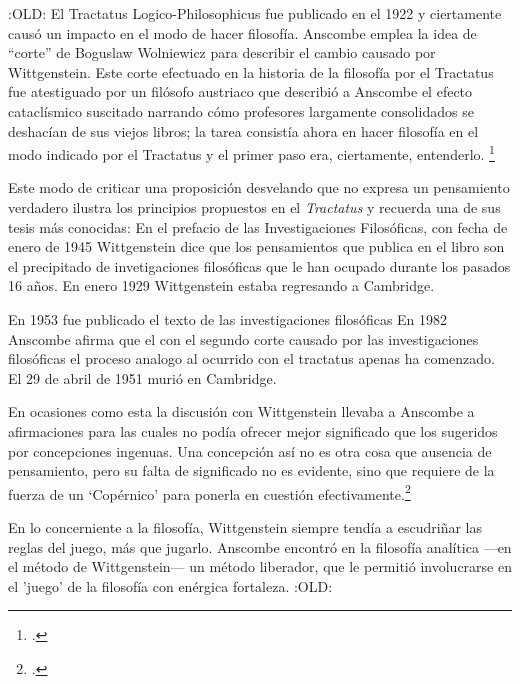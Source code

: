 \begin{revision}
:OLD:
El Tractatus Logico-Philosophicus fue publicado en el 1922 y ciertamente causó
un impacto en el modo de hacer filosofía. Anscombe emplea la idea de ``corte''
de Boguslaw Wolniewicz para describir el cambio causado por Wittgenstein. Este
corte efectuado en la historia de la filosofía por el Tractatus fue atestiguado
por un filósofo austriaco que describió a Anscombe el efecto cataclísmico
suscitado narrando cómo profesores largamente consolidados se deshacían de sus
viejos libros; la tarea consistía ahora en hacer filosofía en el modo indicado
por el Tractatus y el primer paso era, ciertamente, entenderlo.
\footcite[p.181]{twocuts} 
\end{revision}

\begin{revision}
Este modo de criticar una proposición desvelando que no expresa un pensamiento
verdadero ilustra los principios propuestos en el \emph{Tractatus} y recuerda
una de sus tesis más conocidas: 
En el prefacio de las Investigaciones Filosóficas, con fecha de enero de 1945
Wittgenstein dice que los pensamientos que publica en el libro son el
precipitado de invetigaciones filosóficas que le han ocupado durante los pasados
16 años. En enero 1929 Wittgenstein estaba regresando a Cambridge.
\end{revision}

\begin{revision}
En 1953 fue publicado el texto de las investigaciones filosóficas
En 1982 Anscombe afirma que el con el segundo corte causado por las
investigaciones filosóficas el proceso analogo al ocurrido con el tractatus
apenas ha comenzado.
El 29 de abril de 1951 murió en Cambridge. 
\end{revision}

\begin{revision}
En ocasiones como esta la
discusión con Wittgenstein llevaba a Anscombe a afirmaciones para las cuales no
podía ofrecer mejor significado que los sugeridos por concepciones ingenuas. Una
concepción así no es otra cosa que ausencia de pensamiento, pero su falta de
significado no es evidente, sino que requiere de la fuerza de un `Copérnico'
para ponerla en cuestión efectivamente.\footcite[cf. 151]{IWT} 
\end{revision}

\begin{revision}
En lo concerniente a la filosofía, Wittgenstein siempre tendía a escudriñar las
reglas del juego, más que jugarlo. 
Anscombe encontró en la filosofía analítica ---en el método de Wittgenstein---
un método liberador, que le permitió involucrarse en el 'juego' de la filosofía
con enérgica fortaleza. 
:OLD:
\end{revision}

